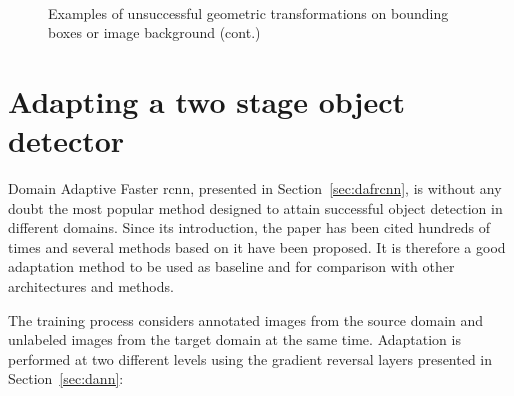 \documentclass[%
    corpo=12pt,
    twoside,
    stile=classica,   
    tipotesi=magistrale,
    evenboxes,
    english,
	numerazioneromana,
]{toptesi}
\begin{document}
\begin{figure}[ht]\ContinuedFloat
	\centering
	\\
	\caption{Examples of unsuccessful geometric transformations on bounding boxes or image background (cont.)}
	\label{fig:badaugs}
\end{figure}

\section{Adapting a two stage object detector}
Domain Adaptive Faster \acrshort{rcnn}\cite{chen2018domain}, presented in Section~\ref{sec:dafrcnn}, is without any doubt the most popular method designed to attain successful object detection in different domains. Since its introduction, the paper has been cited hundreds of times and several methods based on it have been proposed. It is therefore a good adaptation method to be used as baseline and for comparison with other architectures and methods.

The training process considers annotated images from the source domain and unlabeled images from the target domain at the same time. Adaptation is performed at two different levels  using the gradient reversal layers presented in Section~\ref{sec:dann}:
\end{document}
